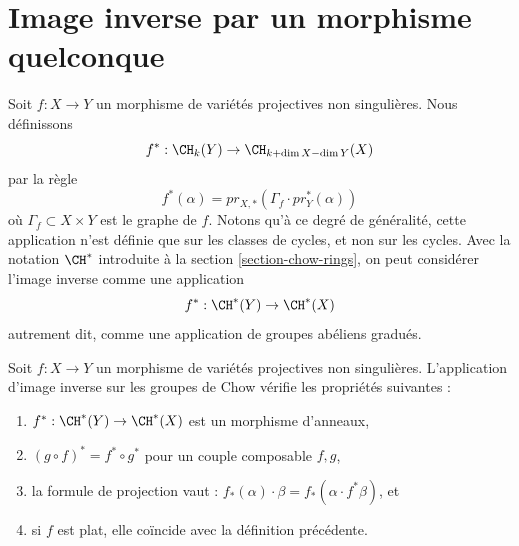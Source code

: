 \section{Image inverse par un morphisme quelconque}
\label{section-general-pullback}

\noindent
Soit $f : X \to Y$ un morphisme de variétés projectives non singulières.
Nous définissons
$$
f^* : \CH_k(Y) \to \CH_{k+\dim X - \dim Y}(X)
$$
par la règle
$$
f^*(\alpha) = pr_{X, *}(\Gamma_f \cdot pr_Y^*(\alpha))
$$
où $\Gamma_f \subset X\times Y$ est le graphe de $f$. Notons qu'à ce
degré de généralité, cette application n'est définie que sur les classes de cycles, et non sur les cycles. Avec la
notation $\CH^*$ introduite à la section \ref{section-chow-rings},
on peut considérer l'image inverse comme une application
$$
f^* : \CH^*(Y) \to \CH^*(X)
$$
autrement dit, comme une application de groupes abéliens gradués.

\begin{lemma}
\label{lemma-pullback-and-intersection-product}
Soit $f : X \to Y$ un morphisme de variétés projectives non singulières.
L'application d'image inverse sur les groupes de Chow vérifie les propriétés suivantes :
\begin{enumerate}
\item $f^* : \CH^*(Y) \to \CH^*(X)$ est un morphisme d'anneaux,
\item $(g \circ f)^* = f^* \circ g^*$ pour un couple composable $f, g$,
\item la formule de projection vaut : $f_*(\alpha) \cdot \beta =
f_*( \alpha \cdot f^*\beta)$, et
\item si $f$ est plat, elle coïncide avec la définition précédente.
\end{enumerate}
\end{lemma}

